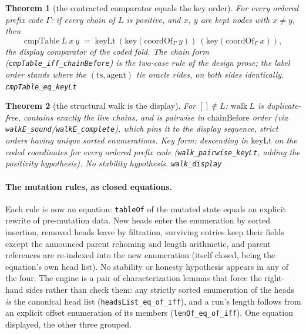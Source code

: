 \documentclass[11pt]{article}
\newtheorem{theorem}{Theorem}[section]
\newcommand{\lean}[1]{\texttt{#1}}
\begin{document}
\begin{theorem}[the contracted comparator equals the key order]
\label{thm:runcmp}
For every ordered prefix code $\Gamma$: if every chain of $L$ is
positive, and $x$, $y$ are kept nodes with $x \neq y$, then
\[
  \mathrm{cmpTable}\ L\ x\ y \;=\; \mathrm{keyLt}\
  (\mathrm{key}(\mathrm{coordOf}_\Gamma\ y))\
  (\mathrm{key}(\mathrm{coordOf}_\Gamma\ x)),
\]
the display comparator of the coded fold. The chain form
(\lean{cmpTable\_iff\_chainBefore}) is the two-case rule of the design
prose; the label order stands where the $(\mathrm{ts},
\mathrm{agent})$ tie oracle rides, on both sides identically.
\hfill\lean{cmpTable\_eq\_keyLt}
\end{theorem}

\begin{theorem}[the structural walk is the display]
\label{thm:runwalk}
For $[] \notin L$: $\mathrm{walk}\ L$ is duplicate-free, contains
exactly the live chains, and is pairwise in $\mathrm{chainBefore}$
order (via \lean{walkE\_sound}/\lean{walkE\_complete}), which pins it
to \emph{the} display sequence, strict orders having unique sorted
enumerations. Key form: descending in $\mathrm{keyLt}$ on the coded
coordinates for every ordered prefix code
(\lean{walk\_pairwise\_keyLt}, adding the positivity hypothesis). No
stability hypothesis.
\hfill\lean{walk\_display}
\end{theorem}

\paragraph{The mutation rules, as closed equations.} Each rule is now
an equation: \lean{tableOf} of the mutated state equals an explicit
rewrite of pre-mutation data. New heads enter the enumeration by sorted
insertion, removed heads leave by filtration, surviving entries keep
their fields except the announced parent rehoming and length
arithmetic, and parent references are re-indexed into the new
enumeration (itself closed, being the equation's own head list). No
stability or honesty hypothesis appears in any of the four. The engine
is a pair of characterization lemmas that force the right-hand sides
rather than check them: any strictly sorted enumeration of the heads
\emph{is} the canonical head list (\lean{headsList\_eq\_of\_iff}), and a
run's length follows from an explicit offset enumeration of its members
(\lean{lenOf\_eq\_of\_iff}). One equation displayed, the other three
grouped.
\end{document}
